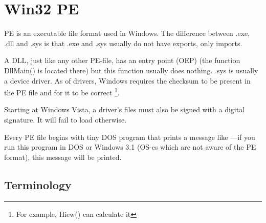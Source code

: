 \section{Win32 PE}
\label{win32_pe}

\acs{PE} is an executable file format used in Windows.
The difference between .exe, .dll and .sys is that .exe and .sys usually do not have exports, only imports.


A \ac{DLL}, just like any other PE-file, has an entry point (\ac{OEP}) (the function DllMain() is located there) 
but this function usually does nothing.
.sys is usually a device driver.
As of drivers, Windows requires the checksum to be present in the PE file and for it to be correct
\footnote{For example, Hiew() can calculate it}.

Starting at Windows Vista, a driver's files must also be signed with a digital signature. It will fail to load otherwise.

Every PE file begins with tiny DOS program that prints a
message like ---if you run this program in DOS or Windows 3.1 (\ac{OS}-es which are not aware of the PE format), 
this message will be printed.

\subsection{Terminology}


